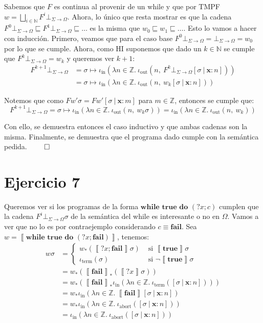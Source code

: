 \documentclass{article}
\newcommand{\sem}[1]{\left\llbracket #1\right\rrbracket}
\newcommand{\N}{\mathbb{N}}
\newcommand{\Z}{\mathbb{Z}}
\newcommand{\x}{\textbf{x}}
\newcommand{\supr}{\bigsqcup\limits}
\newcommand{\fleq}{\sqsubseteq}
\newcommand{\cdomfo}{\Sigma \to \Omega}
\newcommand{\cfbotfo}{\bot_{\cdomfo}}
\newcommand{\ctrue}{\textbf{true}}
\newcommand{\cwhile}[2]{\textbf{while }#1\textbf{ do }#2}
\newcommand{\cfail}{\textbf{fail}}
\newcommand{\iterm}[1]{\iota_\text{term}\left(#1\right)}
\newcommand{\iabort}[1]{\iota_\text{abort}\left(#1\right)}
\newcommand{\iout}[2]{\iota_\text{out}\left(#1,\ #2\right)}
\newcommand{\iin}[2]{\iota_\text{in}\left(\lambda #1 \in \Z .\ #2\right)}
\begin{document}
Sabemos que $F$ es continua al provenir de un while y que por TMPF $w = \supr_{i \in \N} F^i \cfbotfo$.
Ahora, lo único que resta mostrar es que la cadena $F^0 \cfbotfo \fleq F^1 \cfbotfo \fleq \dots$ es la misma que $w_0 \fleq w_1 \fleq \dots$.
Esto lo vamos a hacer con inducción.
Primero, veamos que para el caso base $F^0 \cfbotfo = \cfbotfo = w_0$ por lo que se cumple.
Ahora, como HI suponemos que dado un $k \in \N$ se cumple que $F^k \cfbotfo = w_k$ y queremos ver $k+1$:
\begin{equation*}
  \begin{aligned}
    F^{k+1} \cfbotfo &= \sigma \mapsto \iin{n}{\iout{n}{F^k \cfbotfo [\sigma\ |\ \x : n]}} \\ 
                     &= \sigma \mapsto \iin{n}{\iout{n}{w_k [\sigma\ |\ \x : n]}}
  \end{aligned}
\end{equation*}

Notemos que como $F w' \sigma = F w' [\sigma\ |\ \x : m]$ para $m \in \Z$, entonces se cumple que:
\begin{equation*}
  F^{k+1} \cfbotfo = \sigma \mapsto \iin{n}{\iout{n}{w_k \sigma}} = \iin{n}{\iout{n}{w_k}}
\end{equation*}

Con ello, se demuestra entonces el caso inductivo y que ambas cadenas son la misma.
Finalmente, se demuestra que el programa dado cumple con la semántica pedida. $\qed$

\section*{Ejercicio 7}
Queremos ver si los programas de la forma $\cwhile{\ctrue}{(?x;c)}$ cumplen que la cadena $F^i \cfbotfo \sigma$ de la semántica del while es interesante o no en $\Omega$.
Vamos a ver que no lo es por contraejemplo considerando $c \equiv \cfail$.
Sea $w = \sem{\cwhile{\ctrue}{(?x;\cfail)}}$, tenemos:
\begin{equation*}
  \begin{aligned}
    w\sigma &= \begin{cases}
      w_* (\sem{?x; \cfail}\sigma) &\text{ si }\sem{\ctrue}\sigma \\ 
      \iterm{\sigma} &\text{ si }\neg\sem{\ctrue}\sigma
    \end{cases} \\ 
            &= w_* (\sem{\cfail}_* (\sem{?x}\sigma)) \\ 
            &= w_* (\sem{\cfail}_* \iin{n}{\iterm{[\sigma\ |\ \x : n]}}) \\ 
            &= w_* \iin{n}{\sem{\cfail}[\sigma\ |\ \x : n]} \\ 
            &= w_* \iin{n}{\iabort{[\sigma\ |\ \x : n]}} \\ 
            &= \iin{n}{\iabort{[\sigma\ |\ \x : n]}}
  \end{aligned}
\end{equation*}
\end{document}
